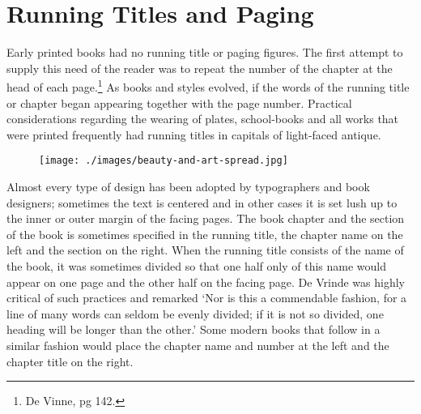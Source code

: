 



\chapter{Running Titles and Paging}

Early printed books had no running title or paging figures. The first attempt to supply this need of the reader was to repeat the number of the chapter at the head of each page.\footnote{De Vinne, pg 142.}  As books and styles evolved, if the words of the running title or chapter began appearing together with the page number. Practical considerations regarding the wearing of plates, school-books and all works that were printed frequently had running titles in capitals of light-faced antique. 

\begin{figure}[htp]
\texttt{[image: ./images/beauty-and-art-spread.jpg]}
\end{figure}

Almost every type of design has been adopted by typographers and book designers; sometimes the text is centered and in other cases it is set lush up to the inner or outer margin of the facing pages. The book chapter and the section of the book is sometimes specified in the running title, the chapter name on the left and the section on the right. When the running title consists of the name of the book, it was sometimes divided so that one half only of this name would appear on one page and the other half on the facing page. De Vrinde was highly critical of such practices and remarked `Nor is this a commendable fashion, for a line of many words can seldom be evenly divided; if it is not so divided, one heading will be longer than the other.’  Some modern books that follow in a similar fashion would place the chapter name and number at the left and the chapter title on the right. 

